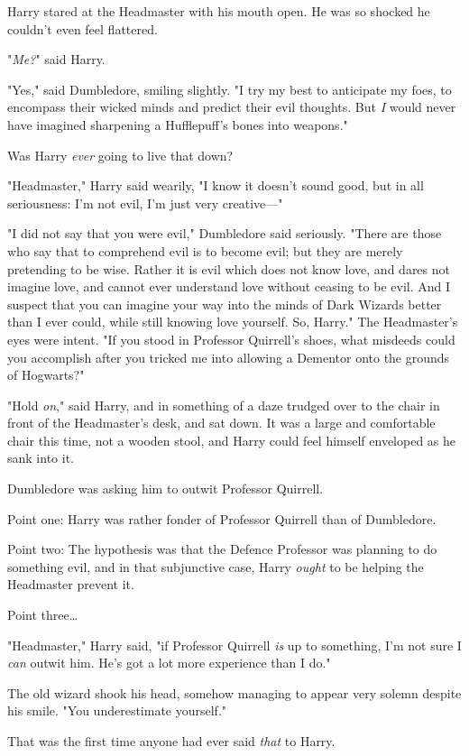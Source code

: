 Harry stared at the Headmaster with his mouth open. He was so shocked he
couldn’t even feel flattered.

"\emph{Me?}" said Harry.

"Yes," said Dumbledore, smiling slightly. "I try my best to anticipate my foes,
to encompass their wicked minds and predict their evil thoughts. But \emph{I}
would never have imagined sharpening a Hufflepuff’s bones into weapons."

Was Harry \emph{ever} going to live that down?

"Headmaster," Harry said wearily, "I know it doesn’t sound good, but in all
seriousness: I’m not evil, I’m just very creative—"

"I did not say that you were evil," Dumbledore said seriously. "There are those
who say that to comprehend evil is to become evil; but they are merely
pretending to be wise. Rather it is evil which does not know love, and dares
not imagine love, and cannot ever understand love without ceasing to be evil.
And I suspect that you can imagine your way into the minds of Dark Wizards
better than I ever could, while still knowing love yourself. So, Harry." The
Headmaster’s eyes were intent. "If you stood in Professor Quirrell’s shoes,
what misdeeds could you accomplish after you tricked me into allowing a
Dementor onto the grounds of Hogwarts?"

"Hold \emph{on}," said Harry, and in something of a daze trudged over to the
chair in front of the Headmaster’s desk, and sat down. It was a large and
comfortable chair this time, not a wooden stool, and Harry could feel himself
enveloped as he sank into it.

Dumbledore was asking him to outwit Professor Quirrell.

Point one: Harry was rather fonder of Professor Quirrell than of Dumbledore.

Point two: The hypothesis was that the Defence Professor was planning to do
something evil, and in that subjunctive case, Harry \emph{ought} to be helping
the Headmaster prevent it.

Point three…

"Headmaster," Harry said, "if Professor Quirrell \emph{is} up to something, I’m
not sure I \emph{can} outwit him. He’s got a lot more experience than I do."

The old wizard shook his head, somehow managing to appear very solemn despite
his smile. "You underestimate yourself."

That was the first time anyone had ever said \emph{that} to Harry.

